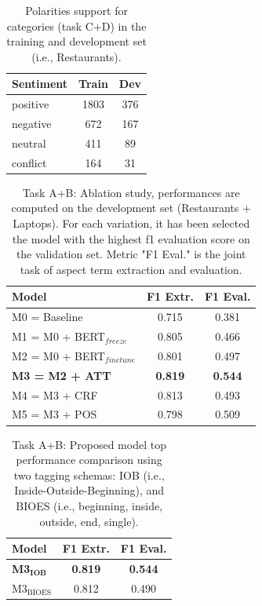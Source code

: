 \documentclass[11pt,a4paper]{article}
\begin{document}
	\begin{table}[H]
		\centering
		\begin{tabular}{@{}lcc@{}}
			\toprule
			\textbf{Sentiment} & Train & Dev \\ \midrule
			positive           & 1803  & 376 \\
			negative           & 672   & 167 \\
			neutral            & 411   & 89  \\
			conflict           & 164   & 31  \\ \bottomrule
		\end{tabular}
		\caption{Polarities support for categories (task C+D) in the training and development set (i.e., Restaurants).}
		\label{tab:cd_polarities_support}
	\end{table}
	
	
	\begin{table}[H]
		\centering
		\begin{tabular}{@{}lcc@{}}
			\toprule
			\textbf{Model}         & F1 Extr.       & F1 Eval.       \\ \midrule
			M0 = Baseline          & 0.715          & 0.381          \\
			M1 = M0 + BERT$_{freeze}$         & 0.805          & 0.466          \\
			M2 = M0 + BERT$_{finetune}$        & 0.801          & 0.497          \\
			\textbf{M3 = M2 + ATT} & \textbf{0.819} & \textbf{0.544} \\
			\midrule
			M4 = M3 + CRF          & 0.813          & 0.493          \\
			M5 = M3 + POS          & 0.798          & 0.509          \\ \bottomrule
		\end{tabular}
		\caption{Task A+B: Ablation study, performances are computed on the development set (Restaurants + Laptops). For each variation, it has been selected the model with the highest f1 evaluation score on the validation set. Metric "F1 Eval." is the joint task of aspect term extraction and evaluation.}
		\label{tab:ab_ablation}
	\end{table}
	
	\begin{table}[H]
		\centering
		\begin{tabular}{@{}lcc@{}}
			\toprule
			\textbf{Model}                        & F1 Extr.       & F1 Eval.       \\
			\midrule
			\textbf{M3$_{\mathbf{IOB}}$} & \textbf{0.819} & \textbf{0.544} \\
			M3$_{\mathrm{BIOES}}$                         & 0.812          & 0.490       
			\\ \bottomrule
		\end{tabular}
		\caption{Task A+B: Proposed model top performance comparison using two tagging schemas: IOB (i.e., Inside-Outside-Beginning), and BIOES (i.e., beginning, inside, outside, end, single).}
		\label{tab:ab_iob_bioes}
	\end{table}
	
\end{document}
